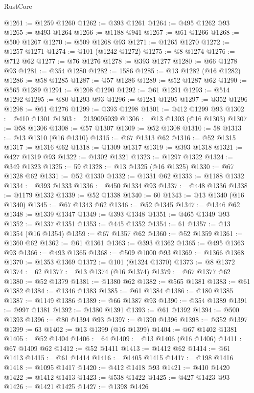\begin{lexlean}{RustCore}
\begin{coremodule}
@1261 := @1259 @1260
@1262 := @393 @1261
@1264 := @495 @1262 @93
@1265 := @493 @1264
@1266 := @1188 @941
@1267 := @61 @1266
@1268 := @500 @1267
@1270 := @509 @1268 @93
@1271 := @1265 @1270
@1272 := @1257 @1271
@1274 := @101 (@1242 @1272)
@1275 := @8 @1274
@1276 := @712 @62
@1277 := @76 @1276
@1278 := @393 @1277
@1280 := @66 @1278 @93
@1281 := @354 @1280
@1282 := 1586
@1285 := @13 @1282 (@16 @1282)
@1286 := @58 @1285
@1287 := @57 @1286
@1289 := @52 @1287 @62
@1290 := @565 @1289
@1291 := @1208 @1290
@1292 := @61 @1291
@1293 := @514 @1292
@1295 := @80 @1293 @93
@1296 := @1281 @1295
@1297 := @352 @1296
@1298 := @61 @1276
@1299 := @393 @1298
@1301 := @412 @1299 @93
@1302 := @410 @1301
@1303 := 2139095039
@1306 := @13 @1303 (@16 @1303)
@1307 := @58 @1306
@1308 := @57 @1307
@1309 := @52 @1308
@1310 := 58
@1313 := @13 @1310 (@16 @1310)
@1315 := @67 @1313 @62
@1316 := @52 @1315
@1317 := @1316 @62
@1318 := @1309 @1317
@1319 := @393 @1318
@1321 := @427 @1319 @93
@1322 := @1302 @1321
@1323 := @1297 @1322
@1324 := @349 @1323
@1325 := 59
@1328 := @13 @1325 (@16 @1325)
@1330 := @67 @1328 @62
@1331 := @52 @1330
@1332 := @1331 @62
@1333 := @1188 @1332
@1334 := @393 @1333
@1336 := @450 @1334 @93
@1337 := @448 @1336
@1338 := @1179 @1332
@1339 := @52 @1338
@1340 := 60
@1343 := @13 @1340 (@16 @1340)
@1345 := @67 @1343 @62
@1346 := @52 @1345
@1347 := @1346 @62
@1348 := @1339 @1347
@1349 := @393 @1348
@1351 := @465 @1349 @93
@1352 := @1337 @1351
@1353 := @445 @1352
@1354 := 61
@1357 := @13 @1354 (@16 @1354)
@1359 := @67 @1357 @62
@1360 := @52 @1359
@1361 := @1360 @62
@1362 := @61 @1361
@1363 := @393 @1362
@1365 := @495 @1363 @93
@1366 := @493 @1365
@1368 := @509 @1000 @93
@1369 := @1366 @1368
@1370 := @1353 @1369
@1372 := @101 (@1324 @1370)
@1373 := @8 @1372
@1374 := 62
@1377 := @13 @1374 (@16 @1374)
@1379 := @67 @1377 @62
@1380 := @52 @1379
@1381 := @1380 @62
@1382 := @565 @1381
@1383 := @61 @1382
@1384 := @1346 @1383
@1385 := @61 @1384
@1386 := @180 @1385
@1387 := @1149 @1386
@1389 := @66 @1387 @93
@1390 := @354 @1389
@1391 := @997 @1381
@1392 := @1380 @1391
@1393 := @61 @1392
@1394 := @500 @1393
@1396 := @80 @1394 @93
@1397 := @1390 @1396
@1398 := @352 @1397
@1399 := 63
@1402 := @13 @1399 (@16 @1399)
@1404 := @67 @1402 @1381
@1405 := @52 @1404
@1406 := 64
@1409 := @13 @1406 (@16 @1406)
@1411 := @67 @1409 @62
@1412 := @52 @1411
@1413 := @1412 @62
@1414 := @61 @1413
@1415 := @61 @1414
@1416 := @1405 @1415
@1417 := @198 @1416
@1418 := @1095 @1417
@1420 := @412 @1418 @93
@1421 := @410 @1420
@1422 := @1412 @1413
@1423 := @538 @1422
@1425 := @427 @1423 @93
@1426 := @1421 @1425
@1427 := @1398 @1426

\end{coremodule}
\end{lexlean}
